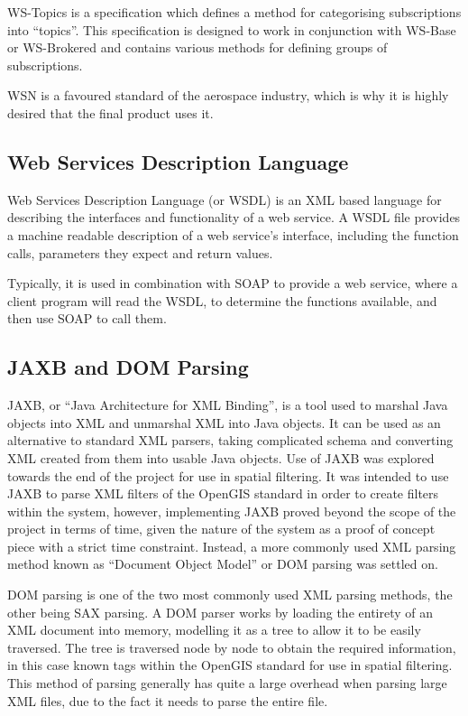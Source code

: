 \documentclass[a4paper, 12pt, twoside]{article}
\begin{document}
WS-Topics is a specification which defines a method for categorising subscriptions into ``topics''. This specification is designed to work in conjunction with WS-Base or WS-Brokered and contains various methods for defining groups of subscriptions.

WSN is a favoured standard of the aerospace industry, which is why it is highly desired that the final product uses it.

\subsection{Web Services Description Language}
\label{sec:bg_wsdl}

Web Services Description Language (or WSDL) is an XML based language for describing the interfaces and functionality of a web service\cite{christensen2001web}. A WSDL file provides a machine readable description of a web service's interface, including the function calls, parameters they expect and return values.

Typically, it is used in combination with SOAP to provide a web service, where a client program will read the WSDL, to determine the functions available, and then use SOAP to call them\cite{curbera2002unraveling}.

\subsection{JAXB and DOM Parsing}
\label{sec:bg_parsing}

JAXB, or ``Java Architecture for XML Binding'', is a tool used to marshal Java objects into XML and unmarshal XML into Java objects. It can be used as an alternative to standard XML parsers, taking complicated schema and converting XML created from them into usable Java objects\cite{ort2003java}. Use of JAXB was explored towards the end of the project for use in spatial filtering. It was intended to use JAXB to parse XML filters of the OpenGIS standard in order to create filters within the system, however, implementing JAXB proved beyond the scope of the project in terms of time, given the nature of the system as a proof of concept piece with a strict time constraint. Instead, a more commonly used XML parsing method known as ``Document Object Model'' or DOM parsing was settled on.

DOM parsing is one of the two most commonly used XML parsing methods, the other being SAX parsing. A DOM parser works by loading the entirety of an XML document into memory, modelling it as a tree to allow it to be easily traversed. The tree is traversed node by node to obtain the required information, in this case known tags within the OpenGIS standard for use in spatial filtering. This method of parsing generally has quite a large overhead when parsing large XML files, due to the fact it needs to parse the entire file.
\end{document}
